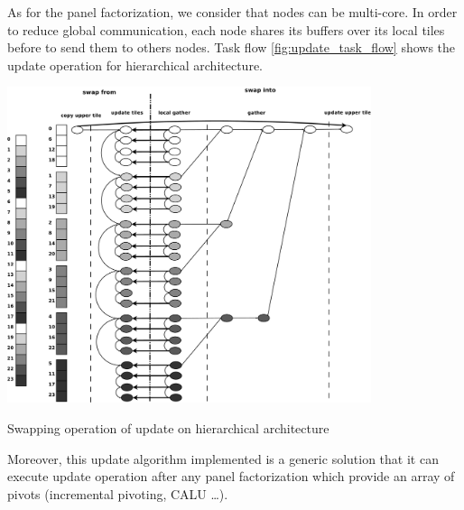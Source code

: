 As for the panel factorization, we consider that nodes can be multi-core. In order to reduce global communication, each node shares its buffers over its local tiles before to send them to others nodes. Task flow \ref{fig:update_task_flow} shows the update operation for hierarchical architecture.

\begin{taskflow}[!ht]
\centering
\includegraphics[width=0.8\textwidth]{figures/update_tf_bw.pdf}
\caption{Swapping operation of update on hierarchical architecture \label{fig:update_task_flow}}
\end{taskflow}

Moreover, this update algorithm implemented is a generic solution that it can execute update operation after any panel factorization which provide an array of pivots (incremental pivoting, CALU \dots).
